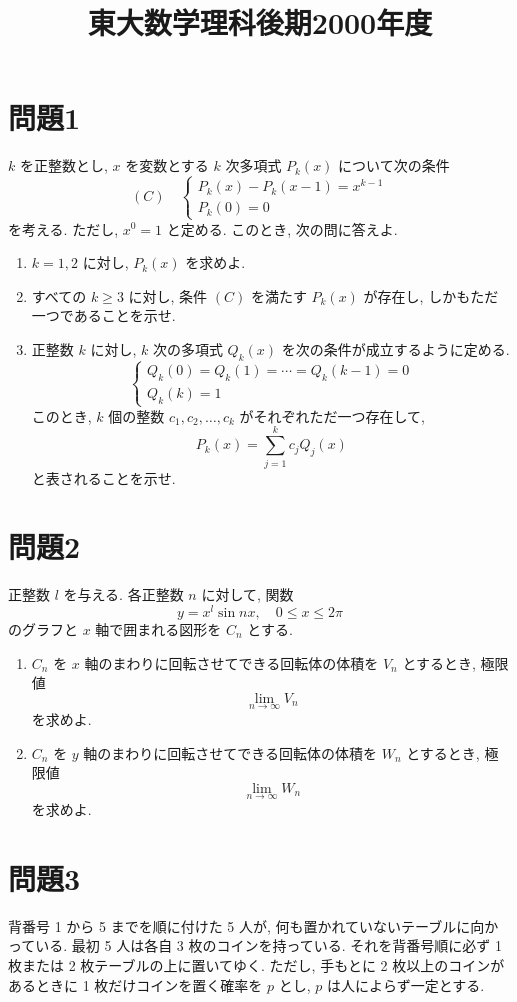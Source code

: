 \documentclass[unicode,12pt, A4j]{ltjsarticle}%
\title{東大数学理科後期2000年度}
\author{}
\date{}
\begin{document}
\maketitle

\section{問題1}
$k$ を正整数とし, $x$ を変数とする $k$ 次多項式 $P_k(x)$ について次の条件
\[
(C) \quad
\begin{cases}
P_k(x) - P_k(x-1) = x^{k-1} \\
P_k(0) = 0
\end{cases}
\]
を考える. ただし, $x^0 = 1$ と定める. このとき, 次の問に答えよ.
\begin{enumerate}
    \item $k = 1, 2$ に対し, $P_k(x)$ を求めよ.
    \item すべての $k \ge 3$ に対し, 条件 $(C)$ を満たす $P_k(x)$ が存在し, しかもただ一つであることを示せ.
    \item 正整数 $k$ に対し, $k$ 次の多項式 $Q_k(x)$ を次の条件が成立するように定める.
    \[
    \begin{cases}
    Q_k(0) = Q_k(1) = \cdots = Q_k(k-1) = 0 \\
    Q_k(k) = 1
    \end{cases}
    \]
    このとき, $k$ 個の整数 $c_1, c_2, \dots, c_k$ がそれぞれただ一つ存在して,
    \[
    P_k(x) = \sum_{j=1}^k c_j Q_j(x)
    \]
    と表されることを示せ.
\end{enumerate}


\section{問題2}
正整数 $l$ を与える. 各正整数 $n$ に対して, 関数
\[
y = x^l \sin nx, \quad 0 \le x \le 2\pi
\]
のグラフと $x$ 軸で囲まれる図形を $C_n$ とする.
\begin{enumerate}
    \item $C_n$ を $x$ 軸のまわりに回転させてできる回転体の体積を $V_n$ とするとき, 極限値
    \[
    \lim_{n \to \infty} V_n
    \]
    を求めよ.
    \item $C_n$ を $y$ 軸のまわりに回転させてできる回転体の体積を $W_n$ とするとき, 極限値
    \[
    \lim_{n \to \infty} W_n
    \]
    を求めよ.
\end{enumerate}

\section{問題3}
背番号 1 から 5 までを順に付けた 5 人が, 何も置かれていないテーブルに向かっている. 最初 5 人は各自 3 枚のコインを持っている. それを背番号順に必ず 1 枚または 2 枚テーブルの上に置いてゆく. ただし, 手もとに 2 枚以上のコインがあるときに 1 枚だけコインを置く確率を $p$ とし, $p$ は人によらず一定とする.
\end{document}
